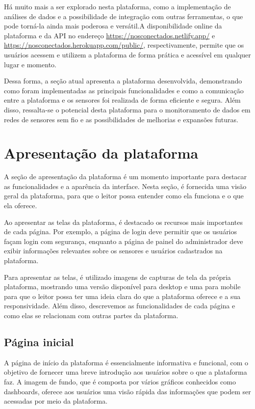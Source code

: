 \documentclass[tcc,capa]{texufpel}
\begin{document}
Há muito mais a ser explorado nesta plataforma, como a implementação de análises de dados e a possibilidade de integração com outras ferramentas, o que pode torná-la ainda mais poderosa e versátil.\space A disponibilidade online da plataforma e da API no endereço \href{https://nosconectados.netlify.app/}{https://nosconectados.netlify.app/} e \href{https://nosconectados.herokuapp.com/public/}{https://nosconectados.herokuapp.com/public/}, respectivamente, permite que os usuários acessem e utilizem a plataforma de forma prática e acessível em qualquer lugar e momento.

Dessa forma, a seção atual apresenta a plataforma desenvolvida, demonstrando como foram implementadas as principais funcionalidades e como a comunicação entre a plataforma e os sensores foi realizada de forma eficiente e segura. Além disso, ressalta-se o potencial desta plataforma para o monitoramento de dados em redes de sensores sem fio e as possibilidades de melhorias e expansões futuras.
\section{Apresentação da plataforma}
A seção de apresentação da plataforma é um momento importante para destacar as funcionalidades e a aparência da interface. Nesta seção, é fornecida uma visão geral da plataforma, para que o leitor possa entender como ela funciona e o que ela oferece.

Ao apresentar as telas da plataforma, é destacado os recursos mais importantes de cada página. Por exemplo, a página de login deve permitir que os usuários façam login com segurança, enquanto a página de painel do administrador deve exibir informações relevantes sobre os sensores e usuários cadastrados na plataforma.

Para apresentar as telas, é utilizado imagens de capturas de tela da própria plataforma, mostrando uma versão disponível para desktop e uma para mobile para que o leitor possa ter uma ideia clara do que a plataforma oferece e a sua responsividade. Além disso, descrevemos as funcionalidades de cada página e como elas se relacionam com outras partes da plataforma.

\subsection{Página inicial}
A página de início da plataforma é essencialmente informativa e funcional, com o objetivo de fornecer uma breve introdução aos usuários sobre o que a plataforma faz. A imagem de fundo, que é composta por vários gráficos conhecidos como dashboards, oferece aos usuários uma visão rápida das informações que podem ser acessadas por meio da plataforma.
\end{document}
